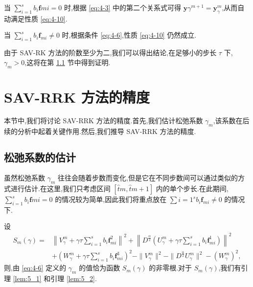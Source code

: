 \begin{pf}
    当 $\sum_{i=1}^s b_i \bm{f}{m i}=0$ 时,根据 \eqref{eq:4-3} 中的第二个关系式可得 $\bm{y}\gamma^{m+1}=\bm{y}_\gamma^m$,从而自动满足性质 \eqref{eq:4-10}.

    当 $\sum_{i=1}^s b_i \bm{f}_{m i}\neq 0$ 时,根据条件 \eqref{eq:4-6},性质 \eqref{eq:4-10} 仍然成立.

由于 SAV-RK 方法的阶数至少为二,我们可以得出结论,在足够小的步长 $\tau$ 下,$\gamma_m>0$,这将在第 \ref{Section 5-1} 节中得到证明.
\end{pf}

\section{SAV-RRK 方法的精度}\label{Section 5}
本节中,我们将讨论 SAV-RRK 方法的精度.首先,我们估计松弛系数 $\gamma_m$,该系数在后续的分析中起着关键作用.然后,我们推导 SAV-RRK 方法的精度.

\subsection{松弛系数的估计}\label{Section 5-1}

虽然松弛系数 $\gamma_m$ 往往会随着步数而变化,但是它在不同步数间可以通过类似的方式进行估计.在这里,我们只考虑区间 $\left[\hat{t}m, \hat{t}{m+1}\right]$ 内的单个步长.在此期间,$\sum_{i=1}^s b_i \bm{f}{m i}=0$ 的情况较为简单,因此我们将重点放在 $\sum{i=1}^s b_i \bm{f}_{m i} \neq 0$ 的情况下.

设
\begin{equation}
	\begin{aligned}
		S_m(\gamma)=&\left\|V_\gamma^m+\gamma \tau \sum\limits_{i=1}^s b_i \bm{f}_{m i}^2\right\|^2 + \left\|D^\frac{\alpha}{2} \left(U_\gamma^m+\gamma \tau \sum\limits_{i=1}^s b_i \bm{f}_{m i}^1\right)\right\|^2\\
	&+\left(W_\gamma^m+\gamma \tau \sum\limits_{i=1}^s b_i \bm{f}_{m i}^3\right)^2-\|V_\gamma^{m}\|^2 - \|D^\frac{\alpha}{2} U_\gamma^{m}\|^2-\left(W_\gamma^{m}\right)^2,
	\end{aligned}
	\end{equation}
    则,由 \eqref{eq:4-6} 定义的 $\gamma_m$ 的值恰为函数 $S_m(\gamma)$ 的非零根.对于 $S_m(\gamma)$,我们有引理 \ref{lem:5_1} 和引理 \ref{lem:5_2}.

